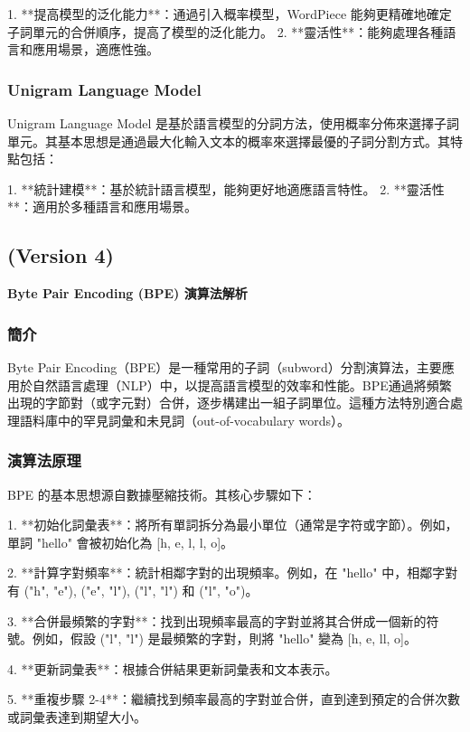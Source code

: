 1. **提高模型的泛化能力**：通過引入概率模型，WordPiece 能夠更精確地確定子詞單元的合併順序，提高了模型的泛化能力。
2. **靈活性**：能夠處理各種語言和應用場景，適應性強。

\subsubsection{Unigram Language Model}

Unigram Language Model 是基於語言模型的分詞方法，使用概率分佈來選擇子詞單元。其基本思想是通過最大化輸入文本的概率來選擇最優的子詞分割方式。其特點包括：

1. **統計建模**：基於統計語言模型，能夠更好地適應語言特性。
2. **靈活性**：適用於多種語言和應用場景。


\myhline
\subsection{(Version 4)}

\textbf{Byte Pair Encoding (BPE) 演算法解析}

\subsubsection{簡介}
Byte Pair Encoding（BPE）是一種常用的子詞（subword）分割演算法，主要應用於自然語言處理（NLP）中，以提高語言模型的效率和性能。BPE通過將頻繁出現的字節對（或字元對）合併，逐步構建出一組子詞單位。這種方法特別適合處理語料庫中的罕見詞彙和未見詞（out-of-vocabulary words）。

\subsubsection{演算法原理}
BPE 的基本思想源自數據壓縮技術。其核心步驟如下：

1. **初始化詞彙表**：將所有單詞拆分為最小單位（通常是字符或字節）。例如，單詞 "hello" 會被初始化為 [h, e, l, l, o]。

2. **計算字對頻率**：統計相鄰字對的出現頻率。例如，在 "hello" 中，相鄰字對有 ("h", "e"), ("e", "l"), ("l", "l") 和 ("l", "o")。

3. **合併最頻繁的字對**：找到出現頻率最高的字對並將其合併成一個新的符號。例如，假設 ("l", "l") 是最頻繁的字對，則將 "hello" 變為 [h, e, ll, o]。

4. **更新詞彙表**：根據合併結果更新詞彙表和文本表示。

5. **重複步驟 2-4**：繼續找到頻率最高的字對並合併，直到達到預定的合併次數或詞彙表達到期望大小。

